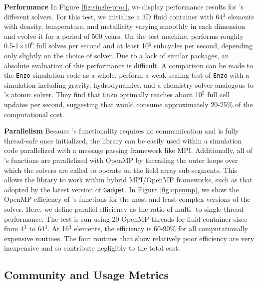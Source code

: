 \noindent
{\bf Performance}
In Figure \ref{fig:single-proc}, we
display performance results for \grackle{}'s different solvers.  For
this test, we initialize a 3D fluid container with 64$^{3}$ elements
with density, temperature, and metallicity varying smoothly in each
dimension and evolve it for a period of 500 years.  On the test
machine, \grackle{} performs
roughly 0.5-1$\times10^{6}$ full solves per second and at least
10$^{6}$ subcycles per second, depending only slightly on the choice
of solver.  Due to a lack of similar packages, an absolute evaluation
of this performance is difficult.  A comparison can be made
to the \texttt{Enzo} simulation code as a whole.
\citet{2014ApJS..211...19B} perform a weak scaling test of
\texttt{Enzo} with a simulation including gravity,
hydrodynamics, and a chemistry solver analogous to \grackle{}'s atomic
solver.  They find that \texttt{Enzo} optimally reaches about 10$^{5}$
full cell updates per second, suggesting that \grackle{} would consume
approximately 20-25\% of the computational cost.

\noindent
{\bf Parallelism}
Because \grackle{}'s functionality requires no communication and is
fully thread-safe once initialized, the library can be easily used
within a simulation code parallelized with a message passing framework
like MPI.  Additionally, all of \grackle{}'s functions are
parallelized with OpenMP by threading the outer loops over which the
solvers are called to operate on the field array sub-segments.  This
allows the library to work within hybrid MPI/OpenMP frameworks, such
as that adopted by the latest version of \texttt{Gadget}.
In Figure \ref{fig:openmp}, we show the OpenMP efficiency of
\grackle{}'s functions for the most and least complex versions
of the solver.  Here, we define parallel efficiency as the ratio of
multi- to single-thread performance.  The test is run using 20 OpenMP
threads for fluid container sizes from 4$^{3}$ to
64$^{3}$.  At 16$^{3}$ elements, the efficiency is 60-90\%
for all computationally expensive routines.  The four routines that
show relatively poor efficiency are very inexpensive and so contribute negligibly to
the total cost.

\subsection{Community and Usage Metrics}

